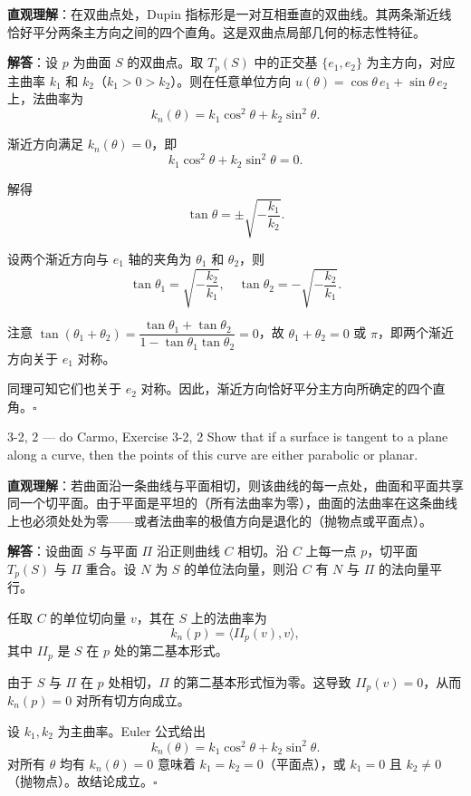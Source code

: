 \begin{solution}
\textbf{直观理解}：在双曲点处，Dupin 指标形是一对互相垂直的双曲线。其两条渐近线恰好平分两条主方向之间的四个直角。这是双曲点局部几何的标志性特征。

\textbf{解答}：设 $p$ 为曲面 $S$ 的双曲点。取 $T_p(S)$ 中的正交基 $\{e_1, e_2\}$ 为主方向，对应主曲率 $k_1$ 和 $k_2$（$k_1 > 0 > k_2$）。则在任意单位方向 $u(\theta) = \cos\theta \, e_1 + \sin\theta \, e_2$ 上，法曲率为
\[
k_n(\theta) = k_1 \cos^2\theta + k_2 \sin^2\theta.
\]

渐近方向满足 $k_n(\theta) = 0$，即
\[
k_1 \cos^2\theta + k_2 \sin^2\theta = 0.
\]

解得
\[
\tan\theta = \pm \sqrt{-\frac{k_1}{k_2}}.
\]

设两个渐近方向与 $e_1$ 轴的夹角为 $\theta_1$ 和 $\theta_2$，则
\[
\tan\theta_1 = \sqrt{-\frac{k_2}{k_1}}, \quad \tan\theta_2 = -\sqrt{-\frac{k_2}{k_1}}.
\]

注意 $\tan(\theta_1 + \theta_2) = \dfrac{\tan\theta_1 + \tan\theta_2}{1 - \tan\theta_1\tan\theta_2} = 0$，故 $\theta_1 + \theta_2 = 0$ 或 $\pi$，即两个渐近方向关于 $e_1$ 对称。

同理可知它们也关于 $e_2$ 对称。因此，渐近方向恰好平分主方向所确定的四个直角。$\square$
\end{solution}

\begin{exercise}{3-2, 2 — do Carmo, Exercise 3-2, 2}
Show that if a surface is tangent to a plane along a curve, then the points of this curve are either parabolic or planar.
\end{exercise}

\begin{solution}
\textbf{直观理解}：若曲面沿一条曲线与平面相切，则该曲线的每一点处，曲面和平面共享同一个切平面。由于平面是平坦的（所有法曲率为零），曲面的法曲率在这条曲线上也必须处处为零——或者法曲率的极值方向是退化的（抛物点或平面点）。

\textbf{解答}：设曲面 $S$ 与平面 $\Pi$ 沿正则曲线 $C$ 相切。沿 $C$ 上每一点 $p$，切平面 $T_p(S)$ 与 $\Pi$ 重合。设 $N$ 为 $S$ 的单位法向量，则沿 $C$ 有 $N$ 与 $\Pi$ 的法向量平行。

任取 $C$ 的单位切向量 $v$，其在 $S$ 上的法曲率为
\[
k_n(p) = \langle II_p(v), v \rangle,
\]
其中 $II_p$ 是 $S$ 在 $p$ 处的第二基本形式。

由于 $S$ 与 $\Pi$ 在 $p$ 处相切，$\Pi$ 的第二基本形式恒为零。这导致 $II_p(v) = 0$，从而 $k_n(p) = 0$ 对所有切方向成立。

设 $k_1, k_2$ 为主曲率。Euler 公式给出
\[
k_n(\theta) = k_1 \cos^2\theta + k_2 \sin^2\theta.
\]
对所有 $\theta$ 均有 $k_n(\theta) = 0$ 意味着 $k_1 = k_2 = 0$（平面点），或 $k_1 = 0$ 且 $k_2 \neq 0$（抛物点）。故结论成立。$\square$
\end{solution}

